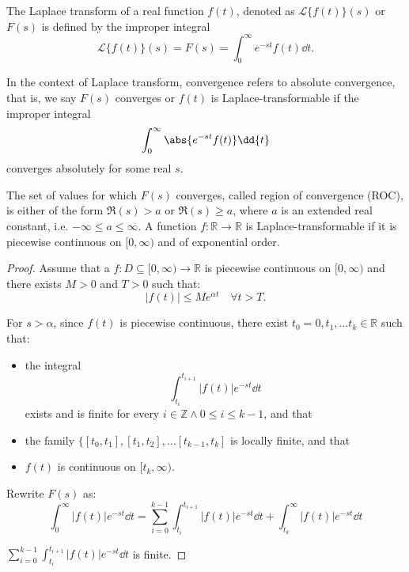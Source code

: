 \documentclass[a4paper,12pt]{report}
\begin{document}
\begin{itemize}
\begin{itemize}
The Laplace transform of a real function $f(t)$, denoted as $\mathcal{L}\{f(t)\}(s)$ or $F(s)$ is defined by the improper integral
\[\mathcal{L}\{f(t)\}(s) = F(s) = \int_0^{\infty} e^{-st} f(t)\dd{t}.\]

In the context of Laplace transform, convergence refers to absolute convergence, that is, we say $F(s)$ converges or $f(t)$ is Laplace-transformable if the improper integral
\[\int_0^{\infty} \abs{e^{-st} f(t)}\dd{t}\]
converges absolutely for some real $s$.

The set of values for which $F(s)$ converges, called region of convergence (ROC), is either of the form $\Re(s) > a$ or $\Re(s) \geq a$, where $a$ is an extended real constant, i.e. $-\infty\leq a\leq\infty$.
A function $f\colon\mathbb{R}\to\mathbb{R}$ is Laplace-transformable if it is piecewise continuous on $[0,\infty)$ and of exponential order.
\begin{proof}
Assume that a $f\colon D\subseteq [0,\infty)\to\mathbb{R}$ is piecewise continuous on $[0,\infty)$ and there exists $M>0$ and $T>0$ such that:
\[|f(t)|\leq Me^{\alpha t}\quad \forall t>T.\]

For $s>\alpha$, since $f(t)$ is piecewise continuous, there exist $t_0=0,t_1,\dots t_k\in\mathbb{R}$ such that:
\begin{itemize}
\item the integral
\[\int_{t_i}^{t_{i+1}} |f(t)| e^{-st}\dd{t}\]
exists and is finite for every $i\in\mathbb{Z}\land 0\leq i\leq k-1$, and that
\item the family $\{[t_0,t_1],[t_1,t_2],\dots [t_{k-1},t_k]$ is locally finite, and that
\item $f(t)$ is continuous on $[t_k,\infty)$.
\end{itemize}

Rewrite $F(s)$ as:
\[\int_0^\infty |f(t)| e^{-st}\dd{t} = \sum_{i=0}^{k-1} \int_{t_i}^{t_{i+1}} |f(t)| e^{-st}\dd{t} + \int_{t_k}^\infty |f(t)| e^{-st}\dd{t}\]

$\sum_{i=0}^{k-1} \int_{t_i}^{t_{i+1}} |f(t)| e^{-st}\dd{t}$ is finite.


\end{proof}
\end{itemize}
\end{itemize}
\end{document}
